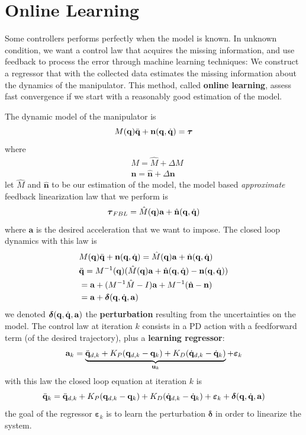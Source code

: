 \documentclass[10pt, a4paper]{report}
\newcommand{\q}{{\mathbf q}}
\begin{document}
\section{Online Learning}
Some controllers performs perfectly when the model is known. In unknown condition, we want a control law that acquires the missing information, and use feedback to process the error through machine learning techniques: We construct a regressor that with the collected data estimates the missing information about the dynamics of the manipulator. This method, called \textbf{online learning}, assess fast convergence if we start with a reasonably good estimation of the model.

The dynamic model of the manipulator is\begin{equation}
    M(\q)\ddq+\mathbf n(\q,\dq)=\btau 
\end{equation}
where \begin{align}
    &M=\hat M+\Delta M\\
    &\mathbf n=\hat{\mathbf n}+\Delta\mathbf n 
\end{align}
let $\hat M$ and $\hat{\mathbf n}$ to be our estimation of the model, the model based \textit{approximate} feedback linearization law that we perform is\begin{equation}
    \btau_{FBL}=\hat M(\q)\mathbf a+\hat{\mathbf n}(\q,\dq)
\end{equation}
where $\mathbf a$ is the desired acceleration that we want to impose. The closed loop dynamics with this law is\begin{align}
    &M(\q)\ddq+\mathbf n(\q,\dq)=\hat M(\q)\mathbf a+\hat{\mathbf n}(\q,\dq)\\ 
    &\ddq =M^{-1}(\q)(\hat M(\q)\mathbf a+\hat{\mathbf n}(\q,\dq)-\mathbf n(\q,\dq))\\ 
    &=\mathbf a + (M^{-1}\hat M-I)\mathbf a+M^{-1}(\hat{\mathbf n}-\mathbf n)\\ 
    &=\mathbf a +\boldsymbol{\delta}(\q,\dq,\mathbf a)
\end{align}
we denoted $\boldsymbol{\delta}(\q,\dq,\mathbf a)$ the \textbf{perturbation} resulting from the uncertainties on the model. The control law at iteration $k$ consists in a PD action with a feedforward term (of the desired trajectory), plus a \textbf{learning regressor}:\begin{equation}
    \mathbf a_k = \underbrace{\ddq_{d,k}+K_P(\q_{d,k}-\q_k)+K_D(\dq_{d,k}-\dq_k)}_{\mathbf u_k}+\boldsymbol{\varepsilon}_k
\end{equation}
with this law the closed loop equation at iteration $k$ is\begin{equation}
    \ddq_k=\ddq_{d,k}+K_P(\q_{d,k}-\q_k)+K_D(\dq_{d,k}-\dq_k)+\boldsymbol{\varepsilon}_k+\boldsymbol{\delta}(\q,\dq,\mathbf a)
\end{equation}
the goal of the regressor $\boldsymbol{\varepsilon}_k$ is to learn the perturbation $\boldsymbol{\delta}$ in order to linearize the system.\bigskip
\end{document}

